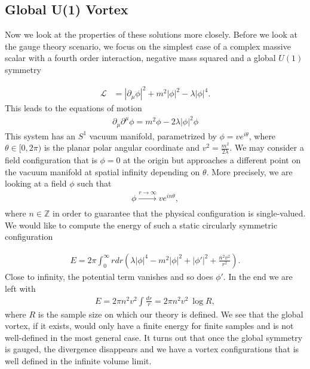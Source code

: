         \subsection{Global U(1) Vortex}

        Now we look at the properties of these solutions more closely. Before we look at the gauge theory scenario, we focus on the simplest case of a complex massive scalar with a fourth order interaction, negative mass squared and a global $U(1)$ symmetry

        \begin{align}
            \mathcal{L} &=  \left|\partial_{\mu} \phi \right|^2 + m^2 | \phi |^2 - \lambda |\phi|^4.
        \end{align}
    This leads to the equations of motion
    \begin{align}
        \partial_{\mu} \partial^{\mu} \phi = m^2 \phi - 2\lambda |\phi|^2 \phi
    \end{align}
    This system has an $S^1$ vacuum manifold, parametrized by $\phi = v e^{i \theta}$, where $\theta \in [0,2\pi)$ is the planar polar angular coordinate and $v^2 = \frac{m^2}{2 \lambda}$. We may consider a field configuration that is $\phi=0$ at the origin but approaches a different point on the vacuum manifold at spatial infinity depending on $\theta$. More precisely, we are looking at a field $\phi$ such that
    \begin{align}
        \phi \xrightarrow[]{r\rightarrow \infty} v e^{i n\theta},
    \end{align}
    where $n \in \mathbb{Z}$ in order to guarantee that the physical configuration is single-valued.
    We would like to compute the energy of such a static circularly symmetric configuration

    \begin{align}
        E= 2 \pi \int_0^{\infty} r dr \left(\lambda |\phi|^4 - m^2 |\phi|^2 + |\phi'|^2 + \frac{n^2 v^2}{r^2} \right).
    \end{align}
    Close to infinity, the potential term vanishes and so does $\phi'$. In the end we are left with
    \begin{align}
        E = 2\pi n^2 v^2 \int \frac{dr}{r} =  2\pi n^2 v^2  \ \log R,
    \end{align}
    where $R$ is the sample size on which our theory is defined. We see that the global vortex, if it exists, would only have a finite energy for finite samples and is not well-defined in the most general case. It turns out that once the global symmetry is gauged, the divergence disappears and we have a vortex configurations that is well defined in the infinite volume limit.

